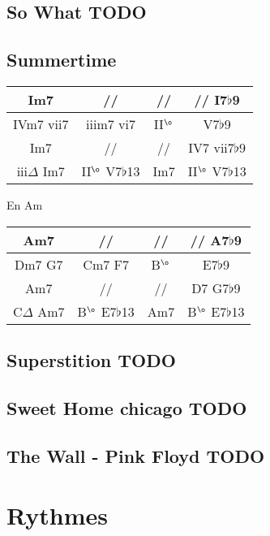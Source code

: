 \documentclass[a4paper,10pt]{article}
\begin{document}
\subsection{So What TODO}
\newpage

\subsection{Summertime}

\begin{tabular}{ | c | c | c | c | } \hline			
	Im7 & // & // & // I7$\flat$9 \\ \hline  
	IVm7 vii7 & iiim7 vi7 & II$^{\o}$ & V7$\flat$9 \\ \hline  
	Im7 & // & // & IV7 vii7$\flat$9 \\ \hline  
	iii$\Delta$ Im7 & II$^{\o}$ V7$\flat$13 & Im7 & II$^{\o}$ V7$\flat$13 \\ \hline  
\end{tabular}
\newline
\newline

En Am

\begin{tabular}{ | c | c | c | c | } \hline			
	Am7 & // & // & // A7$\flat$9 \\ \hline  
	Dm7 G7 & Cm7 F7 & B$^{\o}$ & E7$\flat$9 \\ \hline  
	Am7 & // & // & D7 G7$\flat$9 \\ \hline  
	C$\Delta$ Am7 & B$^{\o}$ E7$\flat$13 & Am7 & B$^{\o}$ E7$\flat$13 \\ \hline  
\end{tabular}
\newpage

\subsection{Superstition TODO}
\newpage

\subsection{Sweet Home chicago TODO}
\newpage

\subsection{The Wall - Pink Floyd TODO}
\newpage

\section{Rythmes}
\end{document}

